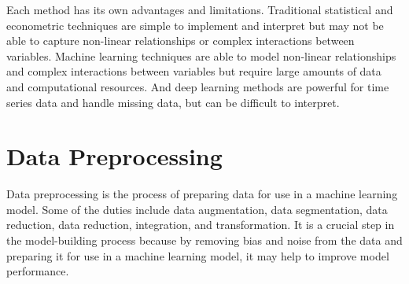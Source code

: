 \documentclass[a4paper]{article}
\begin{document}
Each method has its own advantages and limitations. Traditional statistical and econometric techniques are simple to implement and interpret but may not be able to capture non-linear relationships or complex interactions between variables. Machine learning techniques are able to model non-linear relationships and complex interactions between variables but require large amounts of data and computational resources. And deep learning methods are powerful for time series data and handle missing data, but can be difficult to interpret.

\section{Data Preprocessing}
Data preprocessing is the process of preparing data for use in a machine learning model. Some of the duties include data augmentation, data segmentation, data reduction, data reduction, integration, and transformation. It is a crucial step in the model-building process because by removing bias and noise from the data and preparing it for use in a machine learning model, it may help to improve model performance.
\end{document}

